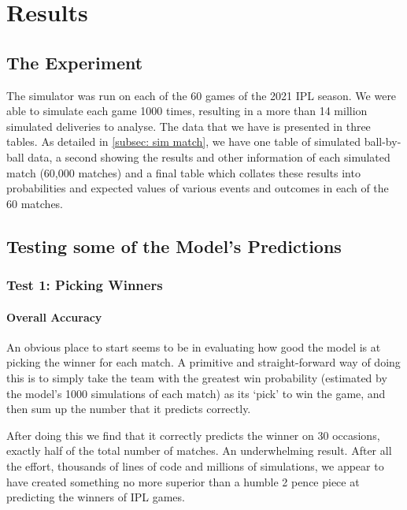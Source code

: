 \titleformat{\chapter}[hang]{\Huge\bfseries}{\thechapter\hsp\textcolor{gray75}{|}\hsp}{0pt}{\Huge\bfseries}
\chapter{Results}

\section{The Experiment}

The simulator was run on each of the 60 games of the 2021 IPL season. We were able to simulate each game 1000 times, resulting in a more than 14 million simulated deliveries to analyse. The data that we have is presented in three tables. As detailed in \cref{subsec: sim match}, we have one table of simulated ball-by-ball data, a second showing the results and other information of each simulated match (60,000 matches) and a final table which collates these results into probabilities and expected values of various events and outcomes in each of the 60 matches.

\section{Testing some of the Model's Predictions}

\subsection{Test 1: Picking Winners}

\subsubsection{Overall Accuracy}

An obvious place to start seems to be in evaluating how good the model is at picking the winner for each match. A primitive and straight-forward way of doing this is to simply take the team with the greatest win probability (estimated by the model's 1000 simulations of each match) as its `pick' to win the game, and then sum up the number that it predicts correctly.

After doing this we find that it correctly predicts the winner on 30 occasions, exactly half of the total number of matches. An underwhelming result. After all the effort, thousands of lines of code and millions of simulations, we appear to have created something no more superior than a humble 2 pence piece at predicting the winners of IPL games.

